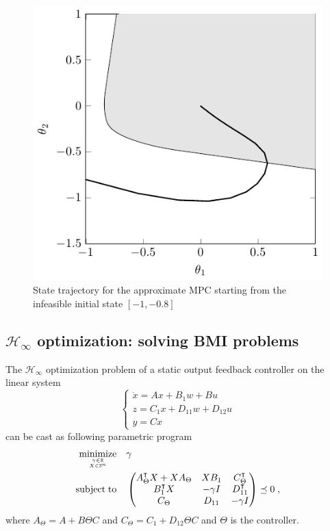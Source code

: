 \documentclass{article}
\DeclareMathOperator*{\minimize}{minimize}
\DeclareMathOperator*{\subj}{subject\;to}
\newcommand{\R}{\mathbb{R}}         %
\renewcommand{\S}{\mathbb{S}}       %
\renewcommand{\t}{\intercal}        %
\newcommand{\pPar}{\Theta}                          %
\begin{document}
\begin{figure}
\centering
\includegraphics{figures/mpc_bemporad2002_if_tikz.pdf}
\caption{State trajectory for the approximate MPC starting from the infeasible
initial state $[-1, -0.8]$}\label{fig:MPC_Bemporad2002}
\end{figure}


\subsection{$\mathcal{H}_\infty$ optimization: solving BMI problems}
The $\mathcal{H}_\infty$ optimization problem of a static output feedback
controller on the linear system
\[
\begin{cases}
\dot{x} = Ax + B_1 w + Bu \\
z = C_1 x + D_{11} w + D_{12} u \\
y = Cx
\end{cases}
\]
can be cast as following parametric program
\[
\begin{aligned}
\minimize_{\gamma \in \R \atop X \in \S^n} &&& \gamma  \\
\subj              &&&
\begin{pmatrix}
A_\pPar^\t X + X A_\pPar  &  XB_1  &  C_\pPar^\t \\
B_1^\t X                  & -\gamma I & D_{11}^\t \\
C_\pPar                   & D_{11}    & -\gamma I
\end{pmatrix} \preceq 0 \; ,
\end{aligned}
\]
where $A_\pPar = A + B \pPar C$ and $C_\pPar = C_1 + D_{12} \pPar C$ and $\pPar$
is the controller.
\end{document}
